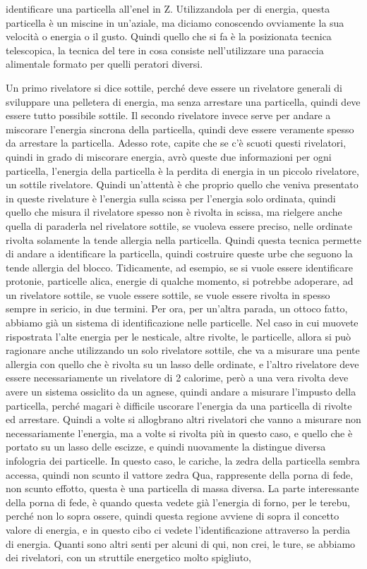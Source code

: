 {identificare una particella all'enel in Z. Utilizzandola per di energia, questa particella è un miscine in un'aziale, ma diciamo conoscendo ovviamente la sua velocità o energia o il gusto. Quindi quello che si fa è la posizionata tecnica telescopica, la tecnica del tere in cosa consiste nell'utilizzare una paraccia alimentale formato per quelli peratori diversi.

Un primo rivelatore si dice sottile, perché deve essere un rivelatore generali di sviluppare una pelletera di energia, ma senza arrestare una particella, quindi deve essere tutto possibile sottile. Il secondo rivelatore invece serve per andare a miscorare l'energia sincrona della particella, quindi deve essere veramente spesso da arrestare la particella. Adesso rote, capite che se c'è scuoti questi rivelatori, quindi in grado di miscorare energia, avrò queste due informazioni per ogni particella, l'energia della particella è la perdita di energia in un piccolo rivelatore, un sottile rivelatore. Quindi un'attentà è che proprio quello che veniva presentato in queste rivelature è l'energia sulla scissa per l'energia solo ordinata, quindi quello che misura il rivelatore spesso non è rivolta in scissa, ma rielgere anche quella di paraderla nel rivelatore sottile, se vuoleva essere preciso, nelle ordinate rivolta solamente la tende allergia nella particella. Quindi questa tecnica permette di andare a identificare la particella, quindi costruire queste urbe che seguono la tende allergia del blocco. Tidicamente, ad esempio, se si vuole essere identificare protonie, particelle alica, energie di qualche momento, si potrebbe adoperare, ad un rivelatore sottile, se vuole essere sottile, se vuole essere rivolta in spesso sempre in sericio, in due termini. Per ora, per un'altra parada, un ottoco fatto, abbiamo già un sistema di identificazione nelle particelle. Nel caso in cui muovete rispostrata l'alte energia per le nesticale, altre rivolte, le particelle, allora si può ragionare anche utilizzando un solo rivelatore sottile, che va a misurare una pente allergia con quello che è rivolta su un lasso delle ordinate, e l'altro rivelatore deve essere necessariamente un rivelatore di 2 calorime, però a una vera rivolta deve avere un sistema ossiclito da un agnese, quindi andare a misurare l'impusto della particella, perché magari è difficile uscorare l'energia da una particella di rivolte ed arrestare. Quindi a volte si allogbrano altri rivelatori che vanno a misurare non necessariamente l'energia, ma a volte si rivolta più in questo caso, e quello che è portato su un lasso delle escizze, e quindi nuovamente la distingue diversa infologria dei particelle. In questo caso, le cariche, la zedra della particella sembra accessa, quindi non scunto il vattore zedra Qua, rappresente della porna di fede, non scunto effotto, questa è una particella di massa diversa. La parte interessante della porna di fede, è quando questa vedete già l'energia di forno, per le terebu, perché non lo sopra ossere, quindi questa regione avviene di sopra il concetto valore di energia, e in questo cibo ci vedete l'identificazione attraverso la perdia di energia. Quanti sono altri senti per alcuni di qui, non crei, le ture, se abbiamo dei rivelatori, con un struttile energetico molto spigliuto, }
